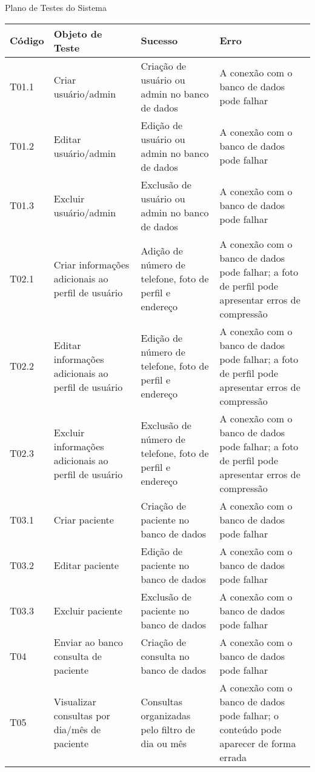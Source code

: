 \begin{quadro}[!htbp]
    \caption{\label{quadro_plano_testes}Plano de Testes do Sistema}
    \small %
    \begin{tabular}{|l|p{4cm}|p{5cm}|p{5cm}|}
        \hline
        \textbf{Código} & \textbf{Objeto de Teste} & \textbf{Sucesso} & \textbf{Erro} \\ \hline
        T01.1 & Criar usuário/admin & Criação de usuário ou admin no banco de dados & A conexão com o banco de dados pode falhar \\ \hline
        T01.2 & Editar usuário/admin & Edição de usuário ou admin no banco de dados & A conexão com o banco de dados pode falhar \\ \hline
        T01.3 & Excluir usuário/admin & Exclusão de usuário ou admin no banco de dados & A conexão com o banco de dados pode falhar \\ \hline
        T02.1 & Criar informações adicionais ao perfil de usuário & Adição de número de telefone, foto de perfil e endereço & A conexão com o banco de dados pode falhar; a foto de perfil pode apresentar erros de compressão \\ \hline
        T02.2 & Editar informações adicionais ao perfil de usuário & Edição de número de telefone, foto de perfil e endereço & A conexão com o banco de dados pode falhar; a foto de perfil pode apresentar erros de compressão \\ \hline
        T02.3 & Excluir informações adicionais ao perfil de usuário & Exclusão de número de telefone, foto de perfil e endereço & A conexão com o banco de dados pode falhar; a foto de perfil pode apresentar erros de compressão \\ \hline
        T03.1 & Criar paciente & Criação de paciente no banco de dados & A conexão com o banco de dados pode falhar \\ \hline
        T03.2 & Editar paciente & Edição de paciente no banco de dados & A conexão com o banco de dados pode falhar \\ \hline
        T03.3 & Excluir paciente & Exclusão de paciente no banco de dados & A conexão com o banco de dados pode falhar \\ \hline
        T04 & Enviar ao banco consulta de paciente & Criação de consulta no banco de dados & A conexão com o banco de dados pode falhar \\ \hline
        T05 & Visualizar consultas por dia/mês de paciente & Consultas organizadas pelo filtro de dia ou mês & A conexão com o banco de dados pode falhar; o conteúdo pode aparecer de forma errada \\ \hline
    \end{tabular}
\end{quadro}

